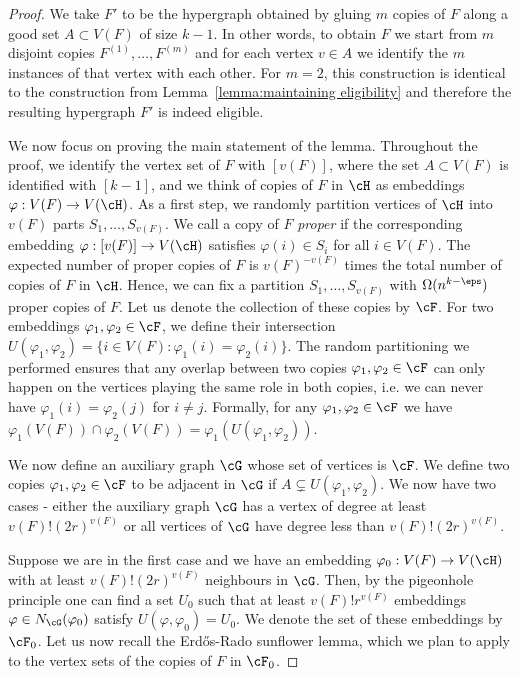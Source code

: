 \begin{proof}
We take $F'$ to be the hypergraph obtained by gluing $m$ copies of $F$ along a good set $A\subset V(F)$ of size $k-1$. In other words, to obtain $F$ we start from $m$ disjoint copies $F^{(1)}, \dots, F^{(m)}$ and for each vertex $v\in A$ we identify the $m$ instances of that vertex with each other. For $m=2$, this construction is identical to the construction from Lemma~\ref{lemma:maintaining eligibility} and therefore the resulting hypergraph $F'$ is indeed eligible. 

We now focus on proving the main statement of the lemma. Throughout the proof, we identify the vertex set of $F$ with $[v(F)]$, where the set $A \subset V(F)$ is identified with $[k-1]$, and we think of copies of $F$ in $\cH$ as embeddings $\varphi:V(F)\to V(\cH)$. As a first step, we randomly partition vertices of $\cH$ into $v(F)$ parts $S_1, \dots, S_{v(F)}$. We call a copy of $F$ \textit{proper} if the corresponding embedding $\varphi:[v(F)]\to V(\cH)$ satisfies $\varphi(i)\in S_i$ for all $i\in V(F)$. The expected number of proper copies of $F$ is $v(F)^{-v(F)}$ times the total number of copies of $F$ in $\cH$. Hence, we can fix a partition $S_1, \dots, S_{v(F)}$ with $\Omega(n^{k-\eps})$ proper copies of $F$. Let us denote the collection of these copies by $\cF$. For two embeddings $\varphi_1, \varphi_2\in \cF$, we define their intersection $U(\varphi_1, \varphi_2)=\{i\in V(F):\varphi_1(i)=\varphi_2(i)\}$. The random partitioning we performed ensures that any overlap between two copies $\varphi_1, \varphi_2\in \cF$ can only happen on the vertices playing the same role in both copies, i.e. we can never have $\varphi_1(i)=\varphi_2(j)$ for $i\neq j$. Formally, for any $\varphi_1, \varphi_2\in \cF$ we have $\varphi_1(V(F))\cap \varphi_2(V(F))=\varphi_1(U(\varphi_1, \varphi_2))$.

We now define an auxiliary graph $\cG$ whose set of vertices is $\cF$. We define two copies $\varphi_1, \varphi_2\in \cF$ to be adjacent in $\cG$ if $A\subsetneq U(\varphi_1, \varphi_2)$. We now have two cases - either the auxiliary graph $\cG$ has a vertex of degree at least $v(F)!(2r)^{v(F)}$ or all vertices of $\cG$ have degree less than $v(F)!(2r)^{v(F)}$.

Suppose we are in the first case and we have an embedding $\varphi_0:V(F)\to V(\cH)$ with at least $v(F)!(2r)^{v(F)}$ neighbours in $\cG$. Then, by the pigeonhole principle one can find a set $U_0$ such that at least $v(F)!r^{v(F)}$ embeddings $\varphi\in N_{\cG}(\varphi_0)$ satisfy $U(\varphi, \varphi_0)=U_0$. We denote the set of these embeddings by $\cF_0$. Let us now recall the Erd\H{o}s-Rado sunflower lemma, which we plan to apply to the vertex sets of the copies of $F$ in $\cF_0$.


\end{proof}
